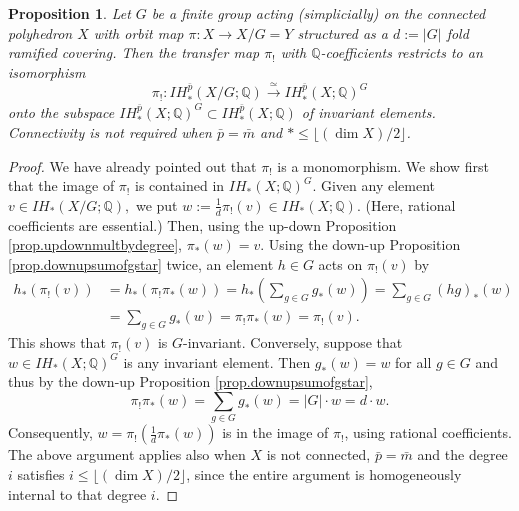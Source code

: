 \documentclass{amsart}
\newtheorem{prop}[thm]{Proposition}
\theoremstyle{definition}
\theoremstyle{remark}
\newcommand {\rat}   {\ensuremath{\mathbb{Q}}}
\newcommand {\bp}    {{\ensuremath{\bar{p}}}}
\newcommand {\bm}    {{\ensuremath{\bar{m}}}}
\begin{document}
\begin{prop} \label{prop.rattransferisisoontoinvariants}
Let $G$ be a finite group acting (simplicially) on the connected polyhedron $X$
with orbit map $\pi: X \to X/G = Y$ structured as a $d:= |G|$ fold
ramified covering. Then the transfer map $\pi_!$ with $\rat$-coefficients
restricts to an isomorphism
\[ \pi_!: IH^\bp_* (X/G;\rat) \stackrel{\simeq}{\longrightarrow} 
        IH^\bp_* (X;\rat)^G \]
onto the subspace $IH^\bp_* (X;\rat)^G \subset IH^\bp_* (X;\rat)$
of invariant elements.        
Connectivity is not required when
$\bp = \bm$ and $* \leq \lfloor (\dim X)/2 \rfloor$.
\end{prop}
\begin{proof}
We have already pointed out that $\pi_!$ is a monomorphism.
We show first that the image of $\pi_!$ is contained in $IH_* (X;\rat)^G$.
Given any element $v\in IH_* (X/G;\rat),$ we put
$w := \frac{1}{d} \pi_! (v) \in IH_* (X;\rat)$. 
(Here, rational coefficients are essential.)
Then, using the up-down Proposition \ref{prop.updownmultbydegree},
$\pi_* (w) = v$.
Using the down-up Proposition \ref{prop.downupsumofgstar} twice, 
an element $h\in G$ acts on $\pi_! (v)$ by
\begin{align*}
h_* (\pi_! (v))
& = h_* (\pi_! \pi_* (w)) 
  = h_* \left( \sum_{g\in G} g_* (w) \right) 
  = \sum_{g\in G} (hg)_* (w)  \\
&= \sum_{g\in G} g_* (w)  
  = \pi_! \pi_* (w) 
  = \pi_! (v).
\end{align*}
This shows that $\pi_! (v)$ is $G$-invariant.
Conversely, suppose that $w \in IH_* (X;\rat)^G$ is any invariant element.
Then $g_* (w)=w$ for all $g\in G$ and thus by the
down-up Proposition \ref{prop.downupsumofgstar},
\[ \pi_! \pi_* (w) = \sum_{g\in G} g_* (w) = |G|\cdot w = d\cdot w. \]
Consequently,
$w = \pi_! \left( \frac{1}{d} \pi_* (w) \right)$
is in the image of $\pi_!$, using rational coefficients.
The above argument applies also when $X$ is not connected,
$\bp = \bm$ and the degree $i$ satisfies $i \leq \lfloor (\dim X)/2 \rfloor$,
since the entire argument is homogeneously internal to that degree $i$.
\end{proof}
\end{document}
